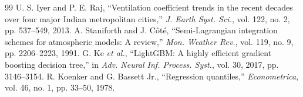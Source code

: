 \documentclass[conference]{IEEEtran}
\begin{document}
\begin{thebibliography}{99}
 U. S. Iyer and P. E. Raj, ``Ventilation coefficient trends in the recent decades over four major Indian metropolitan cities,'' \emph{J. Earth Syst. Sci.}, vol. 122, no. 2, pp. 537--549, 2013.
 A. Staniforth and J. C\^{o}t\'{e}, ``Semi-Lagrangian integration schemes for atmospheric models: A review,'' \emph{Mon. Weather Rev.}, vol. 119, no. 9, pp. 2206--2223, 1991.
 G. Ke \emph{et al.}, ``LightGBM: A highly efficient gradient boosting decision tree,'' in \emph{Adv. Neural Inf. Process. Syst.}, vol. 30, 2017, pp. 3146--3154.
 R. Koenker and G. Bassett Jr., ``Regression quantiles,'' \emph{Econometrica}, vol. 46, no. 1, pp. 33--50, 1978.
\end{thebibliography}
\end{document}
